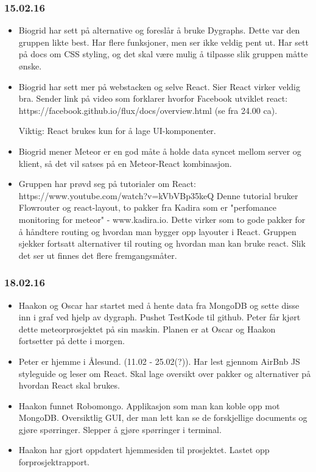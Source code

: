 \documentclass[12pt, oneside]{article}
\begin{document}
\subsubsection{15.02.16}
\begin{itemize}
	\item Biogrid har sett på alternative og foreslår å bruke Dygraphs. Dette var den gruppen likte best. Har flere funksjoner, men ser ikke veldig pent 		ut. Har sett på docs om CSS styling, og det skal være mulig å tilpasse slik gruppen måtte ønske.
	\item Biogrid har sett mer på webstacken og selve React. Sier React virker veldig bra. Sender link på video som forklarer hvorfor Facebook 			utviklet react: https://facebook.github.io/flux/docs/overview.html (se fra 24.00 ca).
	
		Viktig: React brukes kun for å lage UI-komponenter.
	\item Biogrid mener Meteor er en god måte å holde data syncet mellom server og klient, så det vil satses på en Meteor-React kombinasjon. 
	\item Gruppen har prøvd seg på tutorialer om React:\\
		https://www.youtube.com/watch?v=kVbVBp35keQ Denne tutorial bruker Flowrouter og react-layout, to pakker fra Kadira som er 		"perfomance monitoring for meteor" - www.kadira.io. Dette virker som to gode pakker for å håndtere routing og hvordan man bygger opp 			layouter i React. Gruppen sjekker fortsatt alternativer til routing og hvordan man kan bruke react. Slik det ser ut finnes det flere 				fremgangsmåter.
\end{itemize}

\subsubsection{18.02.16}
\begin{itemize}
	\item Haakon og Oscar har startet med å hente data fra MongoDB og sette disse inn i graf ved hjelp av dygraph. Pushet TestKode til github. 			Peter får kjørt dette meteorprosjektet på sin maskin. Planen er at Oscar og Haakon fortsetter på dette i morgen.
	\item Peter er hjemme i Ålesund. (11.02 - 25.02(?)). Har lest gjennom AirBnb JS styleguide og leser om React. Skal lage oversikt over 				pakker og alternativer på hvordan React skal brukes.
	\item Haakon funnet Robomongo. Applikasjon som man kan koble opp mot MongoDB. Oversiktlig GUI, der man lett kan se de forskjellige 			documents og gjøre spørringer. Slepper å gjøre spørringer i terminal.
	\item Haakon har gjort oppdatert hjemmesiden til prosjektet. Lastet opp forprosjektrapport. 
\end{itemize}
\end{document}
